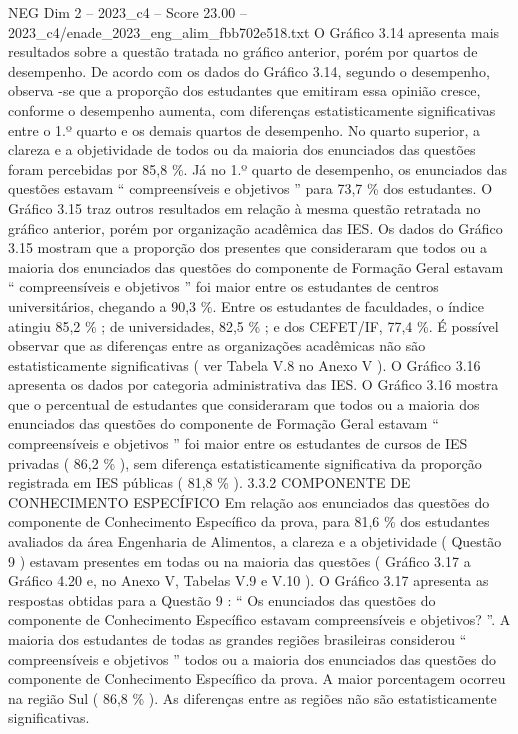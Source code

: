 \begin{textsample}{NEG Dim 2 – 2023\_c4 – Score 23.00 – 2023\_c4/enade\_2023\_eng\_alim\_fbb702e518.txt}
O Gráfico 3.14 apresenta mais resultados sobre a questão tratada no gráfico anterior, porém por quartos de desempenho.
De acordo com os dados do Gráfico 3.14, segundo o desempenho, observa -se que a proporção dos estudantes que emitiram essa opinião cresce, conforme o desempenho aumenta, com diferenças estatisticamente significativas entre o 1.º quarto e os demais quartos de desempenho.
No quarto superior, a clareza e a objetividade de todos ou da maioria dos enunciados das questões foram percebidas por 85,8 \%.
Já no 1.º quarto de desempenho, os enunciados das questões estavam “ compreensíveis e objetivos ” para 73,7 \% dos estudantes.
O Gráfico 3.15 traz outros resultados em relação à mesma questão retratada no gráfico anterior, porém por organização acadêmica das IES.
Os dados do Gráfico 3.15 mostram que a proporção dos presentes que consideraram que todos ou a maioria dos enunciados das questões do componente de Formação Geral estavam “ compreensíveis e objetivos ” foi maior entre os estudantes de centros universitários, chegando a 90,3 \%.
Entre os estudantes de faculdades, o índice atingiu 85,2 \% ; de universidades, 82,5 \% ; e dos CEFET/IF, 77,4 \%.
É possível observar que as diferenças entre as organizações acadêmicas não são estatisticamente significativas ( ver Tabela V.8 no Anexo V ).
O Gráfico 3.16 apresenta os dados por categoria administrativa das IES.
O Gráfico 3.16 mostra que o percentual de estudantes que consideraram que todos ou a maioria dos enunciados das questões do componente de Formação Geral estavam “ compreensíveis e objetivos ” foi maior entre os estudantes de cursos de IES privadas ( 86,2 \% ), sem diferença estatisticamente significativa da proporção registrada em IES públicas ( 81,8 \% ). 3.3.2 COMPONENTE DE CONHECIMENTO ESPECÍFICO Em relação aos enunciados das questões do componente de Conhecimento Específico da prova, para 81,6 \% dos estudantes avaliados da área Engenharia de Alimentos, a clareza e a objetividade ( Questão 9 ) estavam presentes em todas ou na maioria das questões ( Gráfico 3.17 a Gráfico 4.20 e, no Anexo V, Tabelas V.9 e V.10 ).
O Gráfico 3.17 apresenta as respostas obtidas para a Questão 9 : “ Os enunciados das questões do componente de Conhecimento Específico estavam compreensíveis e objetivos? ”.
A maioria dos estudantes de todas as grandes regiões brasileiras considerou “ compreensíveis e objetivos ” todos ou a maioria dos enunciados das questões do componente de Conhecimento Específico da prova.
A maior porcentagem ocorreu na região Sul ( 86,8 \% ).
As diferenças entre as regiões não são estatisticamente significativas.

\end{textsample}
